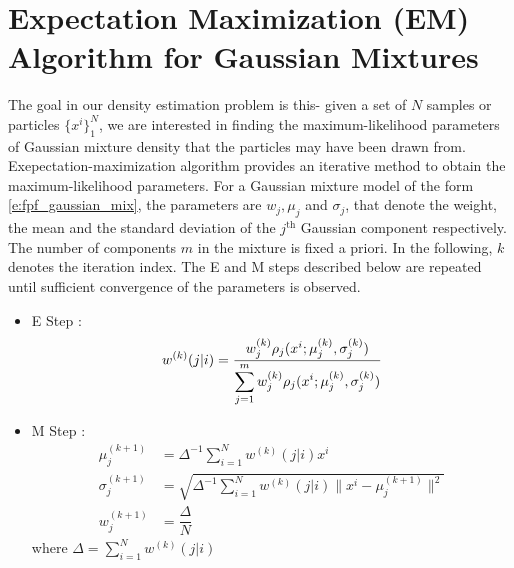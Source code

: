 \chapter{Expectation Maximization (EM) Algorithm for Gaussian Mixtures}
\label{a:em}
The goal in our density estimation problem is this- given a set of $N$ samples or particles $\{x^i\}_1^N$, we are interested in finding the maximum-likelihood parameters of Gaussian mixture density that the particles may have been drawn from. Exepectation-maximization algorithm provides an iterative method to obtain the maximum-likelihood parameters. For a Gaussian mixture model of the form \eqref{e:fpf_gaussian_mix}, the parameters are $w_j, \mu_j$ and $\sigma_j$, that denote the weight, the mean and the standard deviation of the $j^{\text{th}}$ Gaussian component respectively.  The number of components $m$ in the mixture is fixed a priori. In the following, $k$ denotes the iteration index. The E and M steps described below are repeated until sufficient convergence of the parameters is observed. 
\begin{itemize}
\item E Step :
\begin{equation}
w^{(k)}(j|i)= \displaystyle \dfrac{w_{j}^{(k)}\rho_{j}(x^i;\mu_{j}^{(k)},\sigma_{j}^{(k)})}{ \displaystyle \sum_{j=1}^{m} w_{j}^{(k)} \rho_{j}(x^i;\mu_{j}^{(k)},\sigma_{j}^{(k)})}
\end{equation}
\item M Step :
\begin{equation}
\begin{aligned}
\mu_{j}^{(k+1)} &=  \Delta^{-1} \sum_{i=1}^{N}w^{(k)}(j|i)x^i\\
\sigma_{j}^{(k+1)} &=  \sqrt{\Delta^{-1} \displaystyle \sum_{i=1}^{N}w^{(k)}(j|i)\|x^i-\mu_{j}^{(k+1)}\|^2}\\
w_{j}^{(k+1)} &=  \dfrac{\Delta}{N}
\end{aligned}
\end{equation}
where $\Delta = \displaystyle \sum_{i=1}^{N}w^{(k)}(j|i)$
\end{itemize}